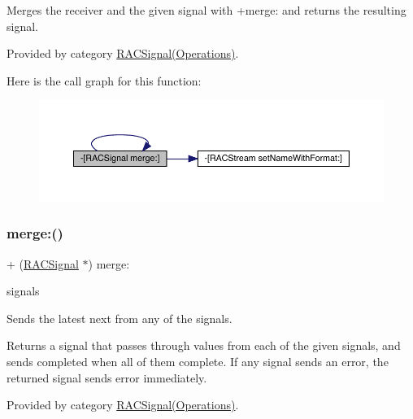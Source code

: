 Merges the receiver and the given signal with {\ttfamily +merge\+:} and returns the resulting signal. 

Provided by category \mbox{\hyperlink{category_r_a_c_signal_07_operations_08_aeda66daaf146a2d218ba7819297628a9}{R\+A\+C\+Signal(\+Operations)}}.

Here is the call graph for this function\+:\nopagebreak
\begin{figure}[H]
\begin{center}
\leavevmode
\includegraphics[width=350pt]{interface_r_a_c_signal_aeda66daaf146a2d218ba7819297628a9_cgraph}
\end{center}
\end{figure}
\mbox{\label{interface_r_a_c_signal_a37d7e9c259ad5253a1f3ff644a86e52b}} 
\subsubsection{\texorpdfstring{merge\+:()}{merge:()}\hspace{0.1cm}{\footnotesize\ttfamily [2/6]}}
{\footnotesize\ttfamily + (\mbox{\hyperlink{interface_r_a_c_signal}{R\+A\+C\+Signal}} $\ast$) merge\+: \begin{DoxyParamCaption}\item[{(id$<$N\+S\+Fast\+Enumeration$>$)}]{signals }\end{DoxyParamCaption}}

Sends the latest {\ttfamily next} from any of the signals.

Returns a signal that passes through values from each of the given signals, and sends {\ttfamily completed} when all of them complete. If any signal sends an error, the returned signal sends {\ttfamily error} immediately. 

Provided by category \mbox{\hyperlink{category_r_a_c_signal_07_operations_08_a37d7e9c259ad5253a1f3ff644a86e52b}{R\+A\+C\+Signal(\+Operations)}}.

